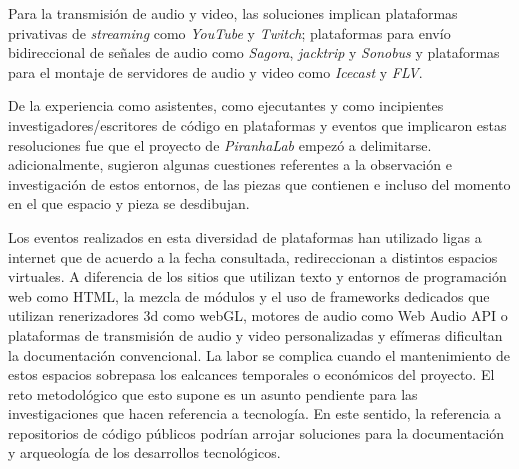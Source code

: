 Para la transmisión de audio y video, las soluciones implican plataformas privativas de \textit{streaming} como \textit{YouTube} y \textit{Twitch}; plataformas para envío bidireccional de señales de audio como \textit{Sagora}, \textit{jacktrip} y \textit{Sonobus} y plataformas para el montaje de servidores de audio y video como \textit{Icecast} y \textit{FLV}. %

De la experiencia como asistentes, como ejecutantes y como incipientes investigadores/escritores de código en plataformas y eventos que implicaron estas resoluciones fue que el proyecto de \textit{PiranhaLab} empezó a delimitarse. adicionalmente, sugieron algunas cuestiones referentes a la observación e investigación de estos entornos, de las piezas que contienen e incluso del momento en el que espacio y pieza se desdibujan. 

Los eventos realizados en esta diversidad de plataformas han utilizado ligas a internet que de acuerdo a la fecha consultada, redireccionan a distintos espacios virtuales. A diferencia de los sitios que utilizan texto y entornos de programación web como HTML, la mezcla de módulos y el uso de frameworks dedicados que utilizan renerizadores 3d como webGL, motores de audio como Web Audio API o plataformas de transmisión de audio y video personalizadas y efímeras dificultan la documentación convencional. La labor se complica cuando el mantenimiento de estos espacios sobrepasa los ealcances temporales o económicos del proyecto. El reto metodológico que esto supone es un asunto pendiente para las investigaciones que hacen referencia a tecnología. En este sentido, la referencia a repositorios de código públicos podrían arrojar soluciones para la documentación y arqueología de los desarrollos tecnológicos. %

\iffalse
\item Exploración de plataformas terminadas                                                             
\item Otros proyectos / espacios en otras plataformas. Recuento. Dos caras: el diseño del espacio y la forma en la que se gestiona la información (por ejemplo de chats o avatares )
\item Italianos
\item Federaves - hipermedial y espacio sonoro
\item Carlos Pesina - three? aframe?                                                                 
\item TOPLAP mx - mozilla hubs                                                                         
\item Randall - aframe 
\item Emmanuel et al
\item Hugo 
\item Soluciones de streaming. Menciones menores que los anteriores: Sagora, youtube, jacktrip, Sonobus
\fi
